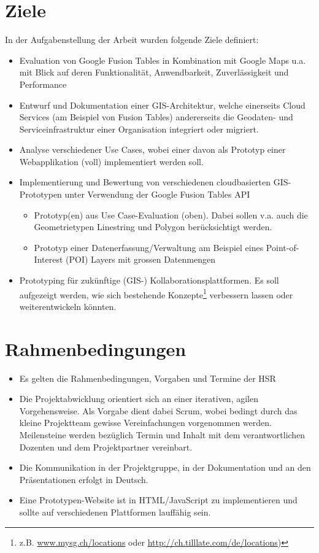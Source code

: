 \section{Ziele}
In der Aufgabenstellung der Arbeit wurden folgende Ziele definiert:
\begin{itemize}
\item Evaluation von Google Fusion Tables in Kombination mit Google Maps u.a. mit Blick auf deren Funktionalität, Anwendbarkeit, Zuverlässigkeit und Performance
\item Entwurf und Dokumentation einer \gls{GIS}-Architektur, welche einerseits \gls{Cloud} Services (am Beispiel von Fusion Tables) andererseits die Geodaten- und Serviceinfrastruktur einer Organisation integriert oder migriert.
\item Analyse verschiedener Use Cases, wobei einer davon als Prototyp einer Webapplikation (voll) implementiert werden soll. 
\item Implementierung und Bewertung von verschiedenen cloudbasierten \gls{GIS}-Prototypen unter Verwendung der Google Fusion Tables \gls{API}
\begin{itemize}
	\item Prototyp(en) aus Use Case-Evaluation (oben). Dabei sollen v.a. auch die Geometrietypen Linestring und Polygon berücksichtigt werden.
	\item Prototyp einer Datenerfassung/Verwaltung am Beispiel eines Point-of-Interest (POI) Layers mit grossen Datenmengen
\end{itemize}
\item Prototyping für zukünftige (\gls{GIS}-) Kollaborationsplattformen. Es soll aufgezeigt werden, wie sich bestehende Konzepte\footnote{z.B. \url{www.mysg.ch/locations} oder \url{http://ch.tilllate.com/de/locations})} verbessern lassen oder weiterentwickeln könnten.
\end{itemize}

\section{Rahmenbedingungen}
\begin{itemize}
\item Es gelten die Rahmenbedingungen, Vorgaben und Termine der HSR
\item Die Projektabwicklung orientiert sich an einer iterativen, agilen Vorgehensweise. Als Vorgabe dient dabei Scrum, wobei bedingt durch das kleine Projektteam gewisse Vereinfachungen vorgenommen werden. Meilensteine werden bezüglich Termin und Inhalt mit dem verantwortlichen Dozenten und dem Projektpartner vereinbart.
\item Die Kommunikation in der Projektgruppe, in der Dokumentation und an den Präsentationen erfolgt in Deutsch.
\item Eine Prototypen-Website ist in HTML/JavaScript zu implementieren und sollte auf verschiedenen Plattformen lauffähig sein.
\end{itemize}

